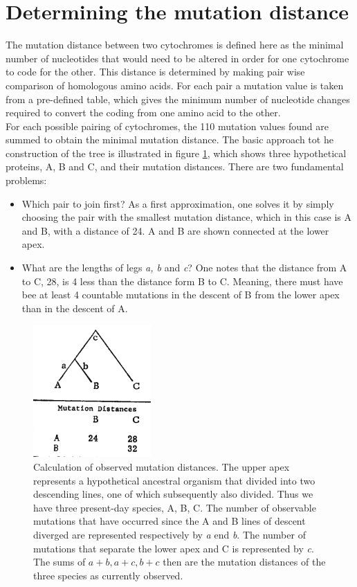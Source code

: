 \section{Determining the mutation distance}
The mutation distance between two cytochromes is defined here as the minimal number of nucleotides that would need to be altered in order for one cytochrome to code for the other. This distance is determined by making pair wise comparison of homologous amino acids. For each pair a mutation value is taken from a pre-defined table, which gives the minimum number of nucleotide changes required to convert the coding from one amino acid to the other. 
\\
For each possible pairing of cytochromes, the 110 mutation values found are summed to obtain the minimal mutation distance. 
The basic approach tot he construction of the tree is illustrated in figure \ref{fig:1}, which shows three hypothetical proteins, A, B and C, and their mutation distances. There are two fundamental problems: 

\begin{itemize}
\item Which pair to join first? As a first approximation, one solves it by simply choosing the pair with the smallest mutation distance, which in this case is A and B, with a distance of 24. A and B are shown connected at the lower apex. 
\item What are the lengths of legs \textit{a, b} and \textit{c}? One notes that the distance from A to C, 28, is 4 less than the distance form B to C. Meaning, there must have bee at least 4 countable mutations in the descent of B from the lower apex than in the descent of A.
\end{itemize}

\begin{figure}[H]
		\centering
		\includegraphics[width=0.4\textwidth]{1.png}
		\caption{Calculation of observed mutation distances. The upper apex represents a hypothetical ancestral organism that divided into two descending lines, one of which subsequently also divided. Thus we have three present-day species, A, B, C. The number of observable mutations that have occurred since the A and B lines of descent diverged are represented respectively by \textit{a} end \textit{b}. The number of mutations that separate the lower apex and C is represented by \textit{c}. The sums of $a+b, a+c, b+c$ then are the mutation distances of the three species as currently observed.}
		\label{fig:1}
	\end{figure}


